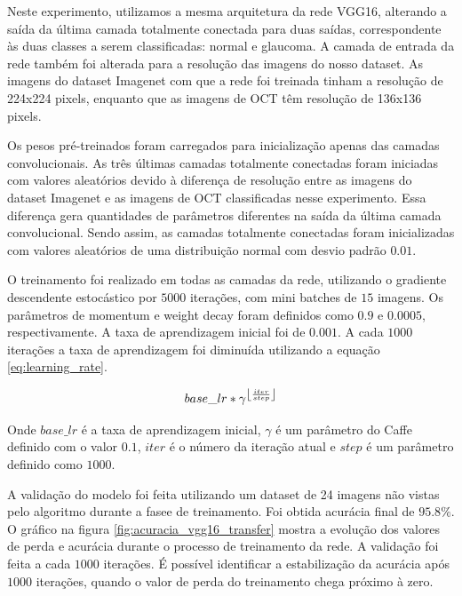 \documentclass[conference]{IEEEtran}
\DeclarePairedDelimiter\floor{\lfloor}{\rfloor}
\begin{document}
  Neste experimento, utilizamos a mesma arquitetura da rede VGG16, alterando a saída da última camada totalmente conectada para duas saídas, correspondente às duas classes a serem classificadas: normal e glaucoma. A camada de entrada da rede também foi alterada para a resolução das imagens do nosso dataset. As imagens do dataset Imagenet com que a rede foi treinada tinham a resolução de 224x224 pixels, enquanto que as imagens de OCT têm resolução de 136x136 pixels.
  
  Os pesos pré-treinados foram carregados para inicialização apenas das camadas convolucionais. As três últimas camadas totalmente conectadas foram iniciadas com valores aleatórios devido à diferença de resolução entre as imagens do dataset Imagenet e as imagens de OCT classificadas nesse experimento. Essa diferença gera quantidades de parâmetros diferentes na saída da última camada convolucional. Sendo assim, as camadas totalmente conectadas foram inicializadas com valores aleatórios de uma distribuição normal com desvio padrão $0.01$.

  O treinamento foi realizado em todas as camadas da rede, utilizando o gradiente descendente estocástico por $5000$ iterações, com mini batches de $15$ imagens. Os parâmetros de momentum e weight decay foram definidos como $0.9$ e $0.0005$, respectivamente. A taxa de aprendizagem inicial foi de $0.001$. A cada $1000$ iterações a taxa de aprendizagem foi diminuída utilizando a equação \ref{eq:learning_rate}.

  \begin{equation}
    base\_lr * \gamma^{\floor*{\frac{iter}{step}}}
    \label{eq:learning_rate}
  \end{equation}

  Onde $base\_lr$ é a taxa de aprendizagem inicial, $\gamma$ é um parâmetro do Caffe definido com o valor $0.1$, $iter$ é o número da iteração atual e $step$ é um parâmetro definido como $1000$.

  A validação do modelo foi feita utilizando um dataset de 24 imagens não vistas pelo algoritmo durante a fasee de treinamento. Foi obtida acurácia final de $95.8\%$. O gráfico na figura \ref{fig:acuracia_vgg16_transfer} mostra a evolução dos valores de perda e acurácia durante o processo de treinamento da rede. A validação foi feita a cada $1000$ iterações. É possível identificar a estabilização da acurácia após $1000$ iterações, quando o valor de perda do treinamento chega próximo à zero.
\end{document}
